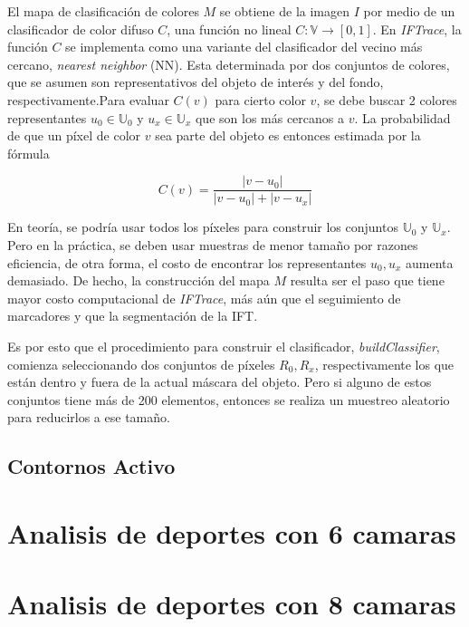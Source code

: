 \documentclass[a4paper,10pt]{article}
\begin{document}
El mapa de clasificación de colores $M$ se obtiene de la imagen $I$ por medio de un
clasificador de color difuso $C$, una función no lineal $C : \mathbb{V} \to [0,1]$.
En \textit{IFTrace}, la función $C$ se implementa como una variante del clasificador
del vecino más cercano, \textit{nearest neighbor} (NN). Esta determinada por dos conjuntos de 
colores, que se asumen son representativos del objeto de interés y del fondo, respectivamente.Para evaluar $C(v)$ para 
cierto color $v$, se debe buscar 2 colores representantes $u_{0} \in \mathbb{U}_{0}$ 
y $u_{x} \in \mathbb{U}_{x}$ que son los más cercanos a $v$.
La probabilidad de que un píxel de color $v$ sea parte del objeto es entonces estimada
por la fórmula

\begin{equation}
   \label{eq:IFTrace-color-classifier}
   C(v) = \frac{|v - u_{0}|}{|v - u_{0}| + |v - u_{x}|}
\end{equation}

En teoría, se podría usar todos los píxeles para construir los conjuntos 
$\mathbb{U}_{0}$ y $\mathbb{U}_{x}$. Pero en la práctica, se deben usar muestras 
de menor tamaño por razones eficiencia, de otra forma, el costo de encontrar los
representantes $u_{0},u_{x}$ aumenta demasiado. De hecho, la construcción del mapa
$M$ resulta ser el paso que tiene mayor costo computacional de \textit{IFTrace}, más
aún que el seguimiento de marcadores y que la segmentación de la IFT.

Es por esto que el procedimiento para construir el clasificador, 
\textit{buildClassifier}, comienza seleccionando dos conjuntos de píxeles 
$R_{0},R_{x}$, respectivamente los que están dentro y fuera de la actual máscara
del objeto. Pero si alguno de estos conjuntos tiene más de 200 elementos,
entonces se realiza un muestreo aleatorio para reducirlos a ese tamaño.

\subsection{Contornos Activo}


\section{Analisis de deportes con 6 camaras}
\label{sec:6-camaras}


\section{Analisis de deportes con 8 camaras}
\label{sec:8-camaras}
\end{document}
